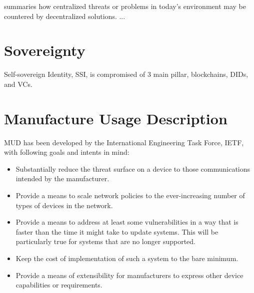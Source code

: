 \cite{Sedlmeir_Smethurst_Rieger_Fridgen_2021} summaries how centralized threats or problems in today's environment may
be countered by decentralized solutions. ...


\section{Sovereignty} %
\label{sec:Sovereignty}

Self-sovereign Identity, SSI, is compromised of 3 main pillar, blockchains, DIDs, and VCs.



\section{Manufacture Usage Description} %
\label{sec:Manufacture Usage Description}

MUD has been developed by the International Engineering Task Force, IETF, with following goals and intents in mind:
\cite{rfc8520-mud}
\begin{itemize}
	\item Substantially reduce the threat surface on a device to those communications intended by the manufacturer.
	\item Provide a means to scale network policies to the ever-increasing number of types of devices in the network.
	\item Provide a means to address at least some vulnerabilities in a way that is faster than the time it might
	      take to update systems. This will be particularly true for systems that are no longer supported.
	\item Keep the cost of implementation of such a system to the bare minimum.
	\item Provide a means of extensibility for manufacturers to express other device capabilities or requirements.
\end{itemize}

